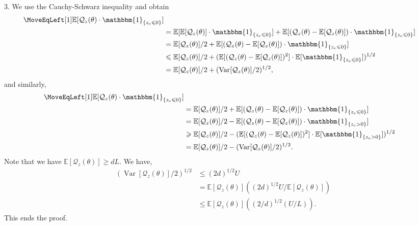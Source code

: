 \documentclass[journal]{IEEEtran}
\DeclareMathOperator{\Var}{Var}   %
\providecommand{\E}{\mathbb{E}} %
\providecommand{\ind}[1]{\ensuremath{\mathbbm{1}_{\left\{#1\right\}}}} %
\renewcommand{\geq}{\geqslant} %
\renewcommand{\leq}{\leqslant} %
\theoremstyle{definition}
\begin{document}
3. We use the Cauchy-Schwarz inequality and obtain
\begin{equation}
\begin{split}
\MoveEqLeft[1]
\E[\mathcal{Q}_z(\theta) \cdot \ind{z_e \leq 0}] \\
&= \E[\E[\mathcal{Q}_z(\theta)] \cdot \ind{z_e \leq 0}] + \E[(\mathcal{Q}_z(\theta) - \E[\mathcal{Q}_z(\theta)]) \cdot \ind{z_e \leq 0}]
\\
&= \E[\mathcal{Q}_z(\theta)] / 2 + \E[(\mathcal{Q}_z(\theta) - \E[\mathcal{Q}_z(\theta)]) \cdot \ind{z_e \leq 0}]
\\
&\leq \E[\mathcal{Q}_z(\theta)] / 2 + (\E[(\mathcal{Q}_z(\theta) - \E[\mathcal{Q}_z(\theta)])^2] \cdot \E[\ind{z_e \leq 0}])^{1/2}
\\
&= \E[\mathcal{Q}_z(\theta)] / 2 + (\Var[\mathcal{Q}_z(\theta)] / 2)^{1/2} ,
\end{split}
\end{equation}
and similarly,
\begin{equation}
\begin{split}
\MoveEqLeft[1]
\E[\mathcal{Q}_z(\theta) \cdot \ind{z_e \leq 0}] \\
&= \E[\mathcal{Q}_z(\theta)] / 2 + \E[(\mathcal{Q}_z(\theta) - \E[\mathcal{Q}_z(\theta)]) \cdot \ind{z_e \leq 0}]
\\
&= \E[\mathcal{Q}_z(\theta)] / 2 - \E[(\mathcal{Q}_z(\theta) - \E[\mathcal{Q}_z(\theta)]) \cdot \ind{z_e > 0}]
\\
&\geq \E[\mathcal{Q}_z(\theta)] / 2 - (\E[(\mathcal{Q}_z(\theta) - \E[\mathcal{Q}_z(\theta)])^2] \cdot \E[\ind{z_e > 0}])^{1/2}
\\
&= \E[\mathcal{Q}_z(\theta)] / 2 - (\Var[\mathcal{Q}_z(\theta)] / 2)^{1/2} .
\end{split}
\end{equation}
Note that we have $\E[\mathcal{Q}_z(\theta)] \geq d L$. 
We have,
\begin{equation}
    \begin{split}
(\Var[\mathcal{Q}_z(\theta)]/ 2)^{1/2} 
&\leq (2 d)^{1/2} U 
\\
&= \E[\mathcal{Q}_z(\theta)] ((2 d)^{1/2} U / \E[\mathcal{Q}_z(\theta)] )
\\
&\leq \E[\mathcal{Q}_z(\theta)] ((2 / d)^{1/2} (U / L) ) .
\end{split}
\end{equation}
This ends the proof.
\end{document}
